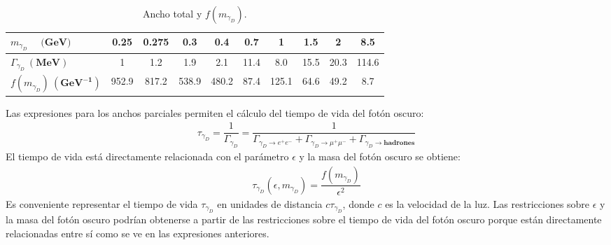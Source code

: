\begin{table}[!ht]
  \begin{center}
    \small
    \begin{tabular}{|l|ccccccccc|} %
		\toprule
		$m_{\gamma_D}$ ~ $\mathbf{(GeV})$& 0.25 & 0.275 & 0.3 & 0.4 & 0.7 & 1 & 1.5 & 2 & 8.5\\
		\midrule
       	$\Gamma_{\gamma_D} ~ \mathbf{(MeV)}$ & 1 & 1.2 & 1.9 & 2.1 & 11.4 & 8.0 & 15.5 & 20.3 & 114.6 \\
       	\midrule
       	$f(m_{\gamma_D}) ~ \mathbf{(GeV^{-1})}$ & 952.9 & 817.2 & 538.9 & 480.2 & 87.4 & 125.1 & 64.6 & 49.2 & 8.7 \\
      	\bottomrule    
    \end{tabular}
    \caption{Ancho total y $f(m_{\gamma_D})$.}
    \label{an-15-455:tb1}
  \end{center}
\end{table}

Las expresiones para los anchos parciales permiten el cálculo del tiempo de vida del fotón oscuro:
\begin{eqnarray}
\label{an-15-455:ec6}
\tau_{\gamma_D} = \dfrac{1}{\Gamma_{\gamma_D}} =\dfrac{1}{\Gamma_{\gamma_D \rightarrow e^+ e^-} + \Gamma_{\gamma_D \rightarrow \mu^+ \mu^-} + \Gamma_{\gamma_D \rightarrow \mathbf{hadrones}}}
\end{eqnarray}
El tiempo de vida está directamente relacionada con el parámetro $\epsilon$ y la masa del fotón oscuro se obtiene:
\begin{eqnarray}
\label{an-15-455:ec7}
\tau_{\gamma_D}(\epsilon,m_{\gamma_D}) =\dfrac{f(m_{\gamma_D})}{\epsilon^2} 
\end{eqnarray}
Es conveniente representar el tiempo de vida $\tau_{\gamma_D}$ en unidades de distancia $c\tau_{\gamma_D}$, donde $c$ es la velocidad de la luz. %
Las restricciones sobre $\epsilon$ y la masa del fotón oscuro podrían obtenerse a partir de las restricciones sobre el tiempo de vida del fotón oscuro porque están directamente relacionadas entre sí como se ve en las expresiones anteriores.


